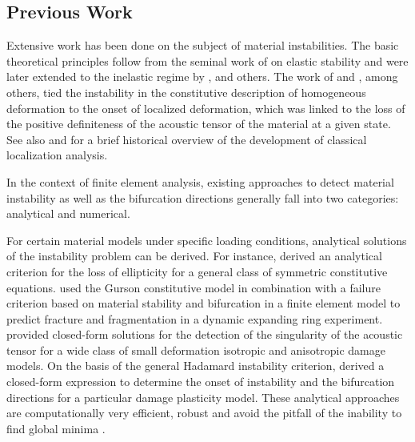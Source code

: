 \documentclass[12pt]{article}
\numberwithin{equation}{section}
\begin{document}
\subsection{Previous Work}

Extensive work has been done on the subject of material instabilities.
The basic theoretical principles follow from the seminal work of
\citet{Hadamard:1903} on elastic stability and were later extended to
the inelastic regime by \citet{Thomas:1961}, \citet{Hill:1962} and
others. The work of \citet{Rudnicki.Riche:1975} and \citet{Rice:1976},
among others, tied the instability in the constitutive description of
homogeneous deformation to the onset of localized deformation, which
was linked to the loss of the positive definiteness of the acoustic
tensor of the material at a given state. See also
\citet*{Armero.Garikipati:1996} and \citet*{Miehe.etal:2004} for a
brief historical overview of the development of classical localization
analysis.

In the context of finite element analysis, existing approaches to
detect material instability as well as the bifurcation directions
generally fall into two categories: analytical and numerical.

For certain material models under specific loading conditions,
analytical solutions of the instability problem can be derived. For
instance, \citet{Schreyer.Neilsen:1996} derived an analytical
criterion for the loss of ellipticity for a general class of symmetric
constitutive equations. \citet{Becker:2002} used the Gurson
constitutive model in combination with a failure criterion based on
material stability and bifurcation in a finite element model to
predict fracture and fragmentation in a dynamic expanding ring
experiment. \citet{Oliver.Huespe:2004} provided closed-form solutions
for the detection of the singularity of the acoustic tensor for a wide
class of small deformation isotropic and anisotropic damage models. On
the basis of the general Hadamard instability criterion,
\citet{Xue.Belytschko:2010} derived a closed-form expression to
determine the onset of instability and the bifurcation directions for
a particular damage plasticity model. These analytical approaches are
computationally very efficient, robust and avoid the pitfall of the
inability to find global minima \citep{Oliver.etal:2010}.
\end{document}
